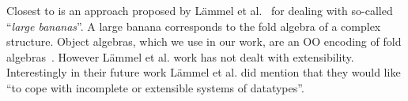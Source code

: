 \begin{comment}
In functional programming there has also been an important line of
work on \emph{datatype-generic programming} (DGP)~\cite{Gibbons07dgp}.  DGP is an
advanced form of \emph{generic programming}~\cite{GP}, where generic
functions are usually defined by inspecting the structure of
types.  Different approaches to DGP in Haskell have been extensively studied and documented~\cite{ComparingGPHaskellRodriquez,ComparingGPHaskellHinze}.
DGP can be used to implement structure-shy traversals as combinators,
similar to the traversals provided by SyB~\cite{hinze2003fun}.
Bringert~\cite{bjorn08acf}
introduced a DGP approach that can also be used to express queries
and transformations.
\end{comment}
Closest to \name is an approach proposed by
L\"ammel et al.~\cite{lammel00dealing} for dealing with so-called
``\emph{large bananas}''. A large banana corresponds to the fold
algebra of a complex structure. Object algebras, which we use in our
work, are an OO encoding of fold algebras~\cite{Oliveira08visitor,bruno12oa}.
However L\"ammel et al. work has not dealt with extensibility. Interestingly
in their future work  L\"ammel et al. did mention that they would like ``to cope
with incomplete or extensible systems of datatypes''.



\begin{comment}
In that
approach for generalized and basic folds. These fold algebras scale up
applications involving large systems of mutually recursive
datatypes. These works all try to optimize traversal control of large
structures in functional programming paradigm, while our work solves a
similar problem in Object Algebras, a programming style in Object
Oriented Programming paradigm.
\end{comment}

